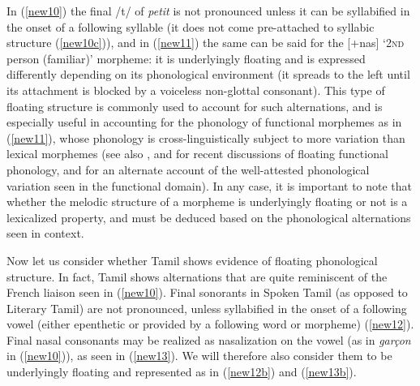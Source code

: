 \documentclass[output=paper]{langscibook}
\begin{document}
In (\ref{new10}) the final /t/ of \textit{petit} is not pronounced unless it can be syllabified in the onset of a following syllable (it does not come pre-attached to syllabic structure (\ref{new10c})), and in (\ref{new11}) the same can be said for the [+nas] ‘2\textsc{nd} person (familiar)’ morpheme: it is underlyingly floating and is expressed differently depending on its phonological environment (it spreads to the left until its attachment is blocked by a voiceless non-glottal consonant). This type of floating structure is commonly used to account for such alternations, and is especially useful in accounting for the phonology of functional morphemes as in (\ref{new11}), whose phonology is cross-linguistically subject to more variation than lexical morphemes (see also \citealt{FaustUlfsbjorninn2018}, and \citealt{newell2019functional} for recent discussions of floating functional phonology, and \citealt{Selkirk1996} for an alternate account of the well-attested phonological variation seen in the functional domain). In any case, it is important to note that whether the melodic structure of a morpheme is underlyingly floating or not is a lexicalized property, and must be deduced based on the phonological alternations seen in context. 

Now let us consider whether Tamil shows evidence of floating phonological structure. In fact, Tamil shows alternations that are quite reminiscent of the French liaison seen in (\ref{new10}). Final sonorants in Spoken Tamil (as opposed to Literary Tamil) are not pronounced, unless syllabified in the onset of a following vowel (either epenthetic or provided by a following word or morpheme) (\ref{new12}). Final nasal consonants may be realized as nasalization on the vowel (as in \textit{garçon} in (\ref{new10})), as seen in (\ref{new13}). We will therefore also consider them to be underlyingly floating and represented as in (\ref{new12b}) and (\ref{new13b}).
\end{document}
